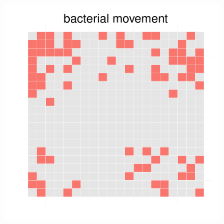 \begin{figure}[h!]
{\begin{minipage}[t]{0.3\textwidth}
  \end{minipage}
  \begin{minipage}[t]{0.3\textwidth}
    \includegraphics[width=\textwidth]{../results/img/ecoli_20x20_aerob_seed55_bac50.pdf}
  \end{minipage}
  }
\end{figure}
